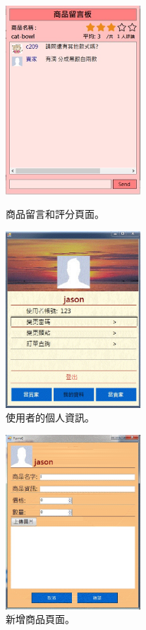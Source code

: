 \documentclass{scrreprt}
\begin{document}
\begin{CJK}{UTF8}{bkai}
\begin{figure}[t]
	\centering
	\includegraphics[width=0.45\textwidth]{star.jpg}
	\caption{商品留言和評分頁面。}
	\centering
	\includegraphics[width=0.45\textwidth]{info.jpg}
	\caption{使用者的個人資訊。}
\end{figure}

\begin{figure}[t]
	\centering
	\includegraphics[width=0.45\textwidth]{addpro.jpg}
	\caption{新增商品頁面。}
\end{figure}


\end{CJK}
\end{document}
